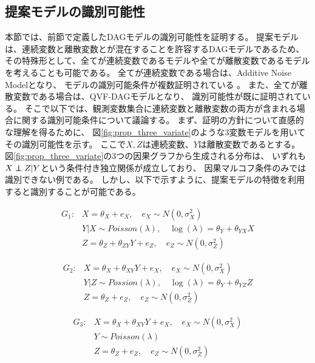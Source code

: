 
\subsection{提案モデルの識別可能性}

本節では、前節で定義したDAGモデルの識別可能性を証明する。
提案モデルは、連続変数と離散変数とが混在することを許容するDAGモデルであるため、
その特殊形として、全てが連続変数であるモデルや全てが離散変数であるモデルを考えることも可能である。
全てが連続変数である場合は、Additive Noise Modelとなり、
モデルの識別可能条件が複数証明されている\cite{Shimizu2006-yu}
\cite{Hoyer2008-oo}
\cite{Peters2013-eb}
\cite{Peters2014-ro}
\cite{Park2020-ey}。
また、全てが離散変数である場合は、QVF-DAGモデル\cite{Park2017-hw}となり、
識別可能性が既に証明されている\cite{Park2017-hw}。
そこで以下では、観測変数集合に連続変数と離散変数の両方が含まれる場合に関する識別可能条件について議論する。
まず、証明の方針について直感的な理解を得るために、
図\ref{fig:prop_three_variate}のような3変数モデルを用いてその識別可能性を示す。
ここで$X,Z$は連続変数、$Y$は離散変数であるとする。
図\ref{fig:prop_three_variate}の3つの因果グラフから生成される分布は、
いずれも$X \mathop{\,\perp\!\!\!\!\!\perp\,} Z | Y$という条件付き独立関係が成立しており、
因果マルコフ条件のみでは識別できない例である。
しかし、以下で示すように、提案モデルの特徴を利用すると識別することが可能である。

\begin{align*}
  G_1 \colon & X = \theta_{X} + e_X, \quad e_X \sim N(0, \sigma_X^2) \\
             & Y|X \sim \mathit{Poisson}(\lambda), \quad \log(\lambda) = \theta_Y + \theta_{YX}X \\
             & Z = \theta_Z + \theta_{ZY}Y + e_Z, \quad e_Z \sim N(0, \sigma_Z^2)
\end{align*}

\begin{align*}
  G_2 \colon & X = \theta_X + \theta_{XY}Y + e_X, \quad e_X \sim N(0, \sigma_X^2) \\
             & Y|Z \sim \mathit{Possion}(\lambda), \quad \log(\lambda) = \theta_Y + \theta_{YZ}Z \\
             & Z = \theta_{Z} + e_Z, \quad e_Z \sim N(0, \sigma_Z^2)
\end{align*}

\begin{align*}
  G_3 \colon & X = \theta_X + \theta_{XY}Y + e_X, \quad e_X \sim N(0, \sigma_X^2) \\
             & Y \sim \mathit{Poisson}(\lambda) \\
             & Z = \theta_{Z} + e_Z, \quad e_Z \sim N(0, \sigma_Z^2)
\end{align*}


